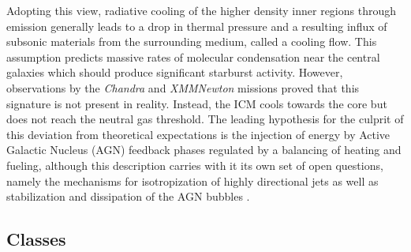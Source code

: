 Adopting this view, radiative cooling of the higher density inner regions through \xray emission generally
leads to a drop in thermal pressure and a resulting influx of subsonic materials from the surrounding medium,
called a cooling flow. This assumption predicts massive rates of molecular condensation near the central galaxies
which should produce significant starburst activity. However, observations by the \textit{Chandra} \cite{weis2000} and 
\textit{XMM{\dash\hspace{0.01em}}Newton} \cite{jans2001}
missions proved that this signature is not present in reality. Instead, the ICM cools towards the core but does not reach
the neutral gas threshold. The leading hypothesis for the culprit of this deviation from theoretical expectations
is the injection of energy by Active Galactic Nucleus (AGN) feedback phases regulated by a balancing of heating
and fueling, although this description carries with it its own set of open questions, namely the mechanisms for
isotropization of highly directional jets as well as stabilization and dissipation of the AGN bubbles
\cite{boeh2010, rosa2002, prat2019}.


\subsection{Classes}

